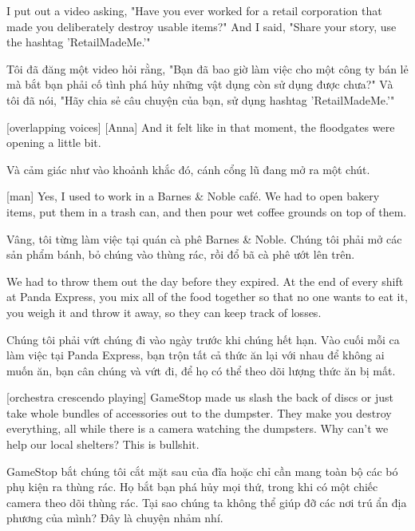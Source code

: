 \documentclass[a4paper]{article}
\begin{document}
	I put out a video asking, "Have you ever worked for a retail corporation that made you deliberately destroy usable items?"
	And I said, "Share your story, use the hashtag 'RetailMadeMe.'"
	
	\begin{vietnamese-v2}
		Tôi đã đăng một video hỏi rằng, "Bạn đã bao giờ làm việc cho một công ty bán lẻ mà bắt bạn phải cố tình phá hủy những vật dụng còn sử dụng được chưa?"
		Và tôi đã nói, "Hãy chia sẻ câu chuyện của bạn, sử dụng hashtag 'RetailMadeMe.'"
	\end{vietnamese-v2}
	
	[overlapping voices]
	[Anna] And it felt like in that moment, the floodgates were opening a little bit.
	
	\begin{vietnamese-v2}
		 Và cảm giác như vào khoảnh khắc đó, cánh cổng lũ đang mở ra một chút.
	\end{vietnamese-v2}
	
	[man] Yes, I used to work in a Barnes \& Noble café.
	We had to open bakery items, put them in a trash can, and then pour wet coffee grounds on top of them.
	
	\begin{vietnamese-v2}
		 Vâng, tôi từng làm việc tại quán cà phê Barnes \& Noble.
		Chúng tôi phải mở các sản phẩm bánh, bỏ chúng vào thùng rác, rồi đổ bã cà phê ướt lên trên.
	\end{vietnamese-v2}
	
	We had to throw them out the day before they expired.
	At the end of every shift at Panda Express, you mix all of the food together so that no one wants to eat it, you weigh it and throw it away, so they can keep track of losses.
	
	\begin{vietnamese-v2}
		Chúng tôi phải vứt chúng đi vào ngày trước khi chúng hết hạn.
		Vào cuối mỗi ca làm việc tại Panda Express, bạn trộn tất cả thức ăn lại với nhau để không ai muốn ăn, bạn cân chúng và vứt đi, để họ có thể theo dõi lượng thức ăn bị mất.
	\end{vietnamese-v2}
	
	[orchestra crescendo playing]
	GameStop made us slash the back of discs or just take whole bundles of accessories out to the dumpster.
	They make you destroy everything, all while there is a camera watching the dumpsters.
	Why can't we help our local shelters? This is bullshit.
	
	\begin{vietnamese-v2}
		GameStop bắt chúng tôi cắt mặt sau của đĩa hoặc chỉ cần mang toàn bộ các bó phụ kiện ra thùng rác.
		Họ bắt bạn phá hủy mọi thứ, trong khi có một chiếc camera theo dõi thùng rác.
		Tại sao chúng ta không thể giúp đỡ các nơi trú ẩn địa phương của mình? Đây là chuyện nhảm nhí.
	\end{vietnamese-v2}
	
\end{document}
